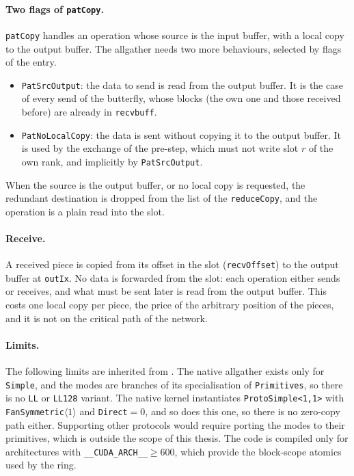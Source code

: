\paragraph{Two flags of \texttt{patCopy}.}
\texttt{patCopy} handles an operation whose source is the input buffer, with a local copy to the output buffer.
The \bine{} allgather needs two more behaviours, selected by flags of the entry.
\begin{itemize}
  \item \texttt{PatSrcOutput}: the data to send is read from the output buffer. It is the case of every send of the butterfly, whose blocks (the own one and those received before) are already in \texttt{recvbuff}.
  \item \texttt{PatNoLocalCopy}: the data is sent without copying it to the output buffer. It is used by the exchange of the pre-step, which must not write slot $r$ of the own rank, and implicitly by \texttt{PatSrcOutput}.
\end{itemize}
When the source is the output buffer, or no local copy is requested, the redundant destination is dropped from the list of the \texttt{reduceCopy}, and the operation is a plain read into the slot.

\paragraph{Receive.}
A received piece is copied from its offset in the slot (\texttt{recvOffset}) to the output buffer at \texttt{outIx}.
No data is forwarded from the slot: each operation either sends or receives, and what must be sent later is read from the output buffer.
This costs one local copy per piece, the price of the arbitrary position of the pieces, and it is not on the critical path of the network.

\paragraph{Limits.}
The following limits are inherited from \pat{}.
The native allgather exists only for \texttt{Simple}, and the \pat{} modes are branches of its specialisation of \texttt{Primitives}, so there is no \texttt{LL} or \texttt{LL128} variant.
The native kernel instantiates \texttt{ProtoSimple<1,1>} with \texttt{FanSymmetric}$\langle1\rangle$ and \texttt{Direct}$=0$, and so does this one, so there is no zero-copy path either.
Supporting other protocols would require porting the \pat{} modes to their primitives, which is outside the scope of this thesis.
The code is compiled only for architectures with \texttt{\_\_CUDA\_ARCH\_\_}$\ge600$, which provide the block-scope atomics used by the ring.

